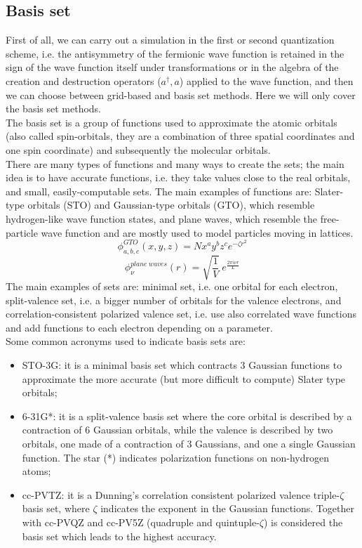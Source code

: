 \subsection{Basis set}
First of all, we can carry out a simulation in the first or second quantization scheme, i.e. the antisymmetry of the fermionic wave function is retained in the sign of the wave function itself under transformations or in the algebra of the creation and destruction operators ($a^{\dagger}, a$) applied to the wave function, and then we can choose between grid-based and basis set methods. Here we will only cover the basis set methods. \\
The basis set is a group of functions used to approximate the atomic orbitals (also called spin-orbitals, they are a combination of three spatial coordinates and one spin coordinate) and subsequently the molecular orbitals. \\
There are many types of functions and many ways to create the sets; the main idea is to have accurate functions, i.e. they take values close to the real orbitals, and small, easily-computable sets. The main examples of functions are: Slater-type orbitals (STO) and Gaussian-type orbitals (GTO), which resemble hydrogen-like wave function states, and plane waves, which resemble the free-particle wave function and are mostly used to model particles moving in lattices.
\begin{equation}
    \phi_{a,b,c}^{GTO} (x,y,z) = N x^a y^b z^c e^{-\zeta r^2}
\end{equation}
\begin{equation}
    \phi_{\nu}^{plane \ waves}(r) = \sqrt{\frac1V} \ e^{\frac{2\pi i\nu r}L}
\end{equation}
The main examples of sets are: minimal set, i.e. one orbital for each electron, split-valence set, i.e. a bigger number of orbitals for the valence electrons, and correlation-consistent polarized valence set, i.e. use also correlated wave functions and add functions to each electron depending on a parameter. \\
Some common acronyms used to indicate basis sets are:
\begin{itemize}
    \item STO-3G: it is a minimal basis set which contracts 3 Gaussian functions to approximate the more accurate (but more difficult to compute) Slater type orbitals;
    
    \item 6-31G*: it is a split-valence basis set where the core orbital is described by a contraction of 6 Gaussian orbitals, while the valence is described by two orbitals, one made of a contraction of 3 Gaussians, and one a single Gaussian function. The star (*) indicates polarization functions on non-hydrogen atoms;
    
    \item cc-PVTZ: it is a Dunning's correlation consistent polarized valence triple-$\zeta$ basis set, where $\zeta$ indicates the exponent in the Gaussian functions. Together with cc-PVQZ and cc-PV5Z (quadruple and quintuple-$\zeta$) is considered the basis set which leads to the highest accuracy.
\end{itemize}

